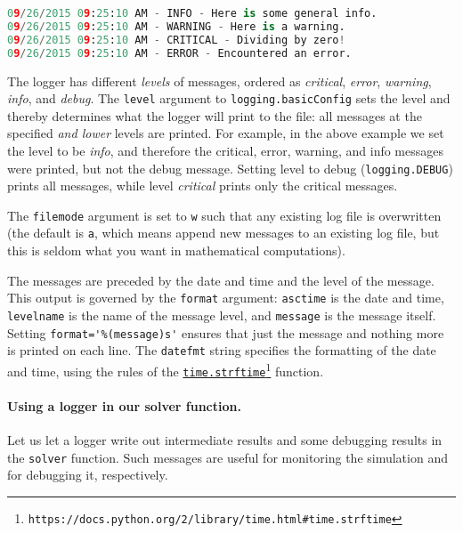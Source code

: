 \documentclass[graybox,sectrefs,envcountresetchap,open=right,final]{svmonodo}
\begin{document}
\begin{lstlisting}[language=Python,style=gray]
09/26/2015 09:25:10 AM - INFO - Here is some general info.
09/26/2015 09:25:10 AM - WARNING - Here is a warning.
09/26/2015 09:25:10 AM - CRITICAL - Dividing by zero!
09/26/2015 09:25:10 AM - ERROR - Encountered an error.
\end{lstlisting}
The logger has different \emph{levels} of messages, ordered as
\emph{critical}, \emph{error}, \emph{warning}, \emph{info}, and \emph{debug}.
The \texttt{level} argument to \texttt{logging.basicConfig} sets the level
and thereby determines what the logger will print to the file:
all messages at the specified \emph{and lower} levels are printed.
For example, in the above example we set the level to be
\emph{info}, and therefore the critical, error, warning, and info
messages were printed, but not the debug message.
Setting level to debug (\texttt{logging.DEBUG}) prints all messages,
while level \emph{critical} prints only the critical messages.

The \texttt{filemode} argument is set to \texttt{w} such that any existing
log file is overwritten (the default is \texttt{a}, which means append
new messages to an existing log file, but this is seldom what
you want in mathematical computations).

The messages are preceded by the date and time and the level of
the message. This output is governed by the \texttt{format} argument:
\texttt{asctime} is the date and time, \texttt{levelname} is the name of
the message level, and \texttt{message} is the message itself.
Setting \Verb!format='%
nothing more is printed on each line. The \texttt{datefmt} string
specifies the formatting of the date and time, using the
rules of the \href{{https://docs.python.org/2/library/time.html#time.strftime}}{\nolinkurl{time.strftime}\footnote{\texttt{https://docs.python.org/2/library/time.html\#time.strftime}}} function.

\paragraph{Using a logger in our solver function.}
Let us let a logger write out intermediate results and some debugging
results in the \texttt{solver} function. Such messages are useful for
monitoring the simulation and for debugging it, respectively.
\end{document}
